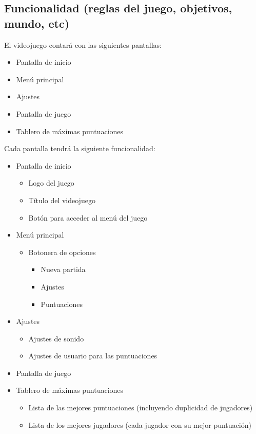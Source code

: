 \documentclass[a4paper]{article}
\begin{document}
\subsection{Funcionalidad (reglas del juego, objetivos, mundo, etc)}
El videojuego contará con las siguientes pantallas:
\begin{itemize}
\item Pantalla de inicio
\item Menú principal
\item Ajustes
\item Pantalla de juego
\item Tablero de máximas puntuaciones
\end{itemize}
Cada pantalla tendrá la siguiente funcionalidad:
\begin{itemize}
  \item Pantalla de inicio
    \begin{itemize}
      \item Logo del juego
      \item Título del videojuego
      \item Botón para acceder al menú del juego
    \end{itemize}
  \item Menú principal
    \begin{itemize}
      \item Botonera de opciones
        \begin{itemize}
          \item Nueva partida
          \item Ajustes
          \item Puntuaciones
        \end{itemize}
    \end{itemize}
  \item Ajustes
    \begin{itemize}
        \item Ajustes de sonido
        \item Ajustes de usuario para las puntuaciones
    \end{itemize}
  \item Pantalla de juego
  \item Tablero de máximas puntuaciones
    \begin{itemize}
        \item Lista de las mejores puntuaciones (incluyendo duplicidad de jugadores)
        \item Lista de los mejores jugadores (cada jugador con su mejor puntuación)
    \end{itemize}
\end{itemize}
\end{document}
